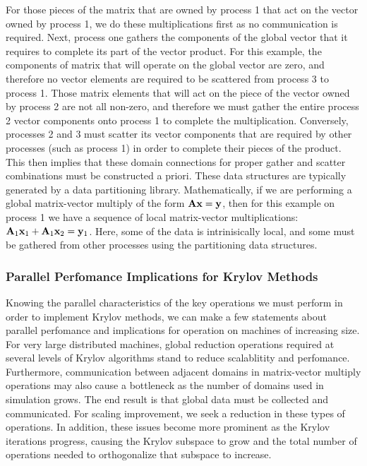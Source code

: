 For those pieces of the matrix that are owned by process 1 that act on
the vector owned by process 1, we do these multiplications first as no
communication is required. Next, process one gathers the components of
the global vector that it requires to complete its part of the vector
product. For this example, the components of matrix that will operate
on the global vector are zero, and therefore no vector elements are
required to be scattered from process 3 to process 1. Those matrix
elements that will act on the piece of the vector owned by process 2
are not all non-zero, and therefore we must gather the entire process
2 vector components onto process 1 to complete the multiplication.
Conversely, processes 2 and 3 must scatter its vector components that
are required by other processes (such as process 1) in order to
complete their pieces of the product. This then implies that these
domain connections for proper gather and scatter combinations must be
constructed a priori. These data structures are typically generated by
a data partitioning library. Mathematically, if we are performing a
global matrix-vector multiply of the form $\mathbf{A}\mathbf{x} = \mathbf{y}$,
then for this example on process 1 we have a sequence of local
matrix-vector multiplications: $\mathbf{A}_1\mathbf{x}_1 + \mathbf{A}_1\mathbf{x}_2 =
\mathbf{y}_1$. Here, some of the data is intrinisically local, and some
must be gathered from other processes using the partitioning data
structures.

\subsubsection{Parallel Perfomance Implications for Krylov Methods}
\label{subsubsec:projection_method_performance}
Knowing the parallel characteristics of the key operations we must
perform in order to implement Krylov methods, we can make a few
statements about parallel perfomance and implications for operation on
machines of increasing size.  For very large distributed machines,
global reduction operations required at several levels of Krylov
algorithms stand to reduce scalablitity and perfomance. Furthermore,
communication between adjacent domains in matrix-vector multiply
operations may also cause a bottleneck as the number of domains used
in simulation grows. The end result is that global data must be
collected and communicated. For scaling improvement, we seek a
reduction in these types of operations. In addition, these issues
become more prominent as the Krylov iterations progress, causing the
Krylov subspace to grow and the total number of operations needed to
orthogonalize that subspace to increase.

